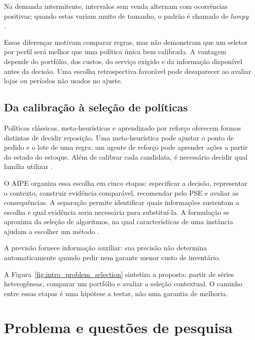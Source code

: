 Na demanda intermitente, intervalos sem venda alternam com ocorrências positivas; quando estas variam muito de tamanho, o padrão é chamado de \textit{lumpy} \citep{Croston1972ForecastingIntermittentDemand,Syntetos2005Categorization,Boylan2008Intermittent}.

Essas diferenças motivam comparar regras, mas não demonstram que um seletor por perfil será melhor que uma política única bem calibrada. A vantagem depende do portfólio, dos custos, do serviço exigido e da informação disponível antes da decisão. Uma escolha retrospectiva favorável pode desaparecer ao avaliar lojas ou períodos não usados no ajuste.

\subsection{Da calibração à seleção de políticas}

Políticas clássicas, meta-heurísticas e aprendizado por reforço oferecem formas distintas de decidir reposição. Uma meta-heurística pode ajustar o ponto de pedido e o lote de uma regra; um agente de reforço pode aprender ações a partir do estado do estoque. Além de calibrar cada candidata, é necessário decidir qual família utilizar \citep{Syntetos2009InventoryForecastingReview,Boute2022DRLInventoryRoadmap}.

O AIPE organiza essa escolha em cinco etapas: especificar a decisão, representar o contexto, construir evidência comparável, recomendar pelo PSE e avaliar as consequências. A separação permite identificar quais informações sustentam a escolha e qual evidência seria necessária para substituí-la. A formulação se aproxima da seleção de algoritmos, na qual características de uma instância ajudam a escolher um método \citep{Rice1976AlgorithmSelection,Kotthoff2014AlgorithmSelection}.

A previsão fornece informação auxiliar: sua precisão não determina automaticamente quando pedir nem garante menor custo de inventário.

A Figura~\ref{fig:intro_problem_selection} sintetiza a proposta: partir de séries heterogêneas, comparar um portfólio e avaliar a seleção contextual. O caminho entre essas etapas é uma hipótese a testar, não uma garantia de melhoria.



\section{Problema e questões de pesquisa}

